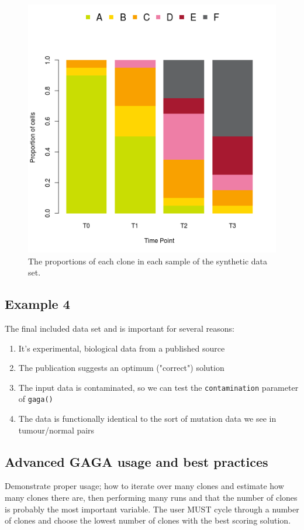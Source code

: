 \documentclass[a4paper]{article}\usepackage[]{graphicx}\usepackage[]{color}
\begin{document}
\begin{figure}[H]
   \centering
       \includegraphics[width=\textwidth]{gaga_synthetic_data_proportions}
       \caption{The proportions of each clone in each sample of the synthetic data set.}
\end{figure}

\subsection{Example 4}
The final included data set and is important for several reasons:

\begin{enumerate}
   \item It's experimental, biological data from a published source \cite{yeast}
   \item The publication suggests an optimum ("correct") solution
   \item The input data is contaminated, so we can test the \texttt{contamination} parameter of \texttt{gaga()} 
   \item The data is functionally identical to the sort of mutation data we see in tumour/normal pairs
\end{enumerate}




\subsection{Advanced GAGA usage and best practices}
Demonstrate proper usage; how to iterate over many clones and estimate how many clones there are, then performing many runs
 and that the number of clones is probably the most important variable.  The user MUST cycle through a number of clones and choose the lowest number of clones with the best scoring solution.
\end{document}
